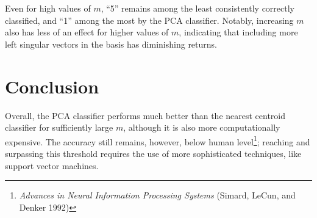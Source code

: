 \documentclass{article}
\begin{document}
\begin{table}[!htbp]
    \centering
    \caption{Accuracy rates for the nearest centroid and PCA classifiers.}
    \label{tab:accuracy}
\end{table}

Even for high values of $m$, ``5'' remains among the least consistently correctly classified, and ``1'' among the most by the PCA classifier. Notably, increasing $m$ also has less of an effect for higher values of $m$, indicating that including more left singular vectors in the basis has diminishing returns.

\section{Conclusion}
Overall, the PCA classifier performs much better than the nearest centroid classifier for sufficiently large $m$, although it is also more computationally expensive. The accuracy still remains, however, below human level\footnote{\textit{Advances in Neural Information Processing Systems} (Simard, LeCun, and Denker 1992)}; reaching and surpassing this threshold requires the use of more sophisticated techniques, like support vector machines.

\appendix
\end{document}

